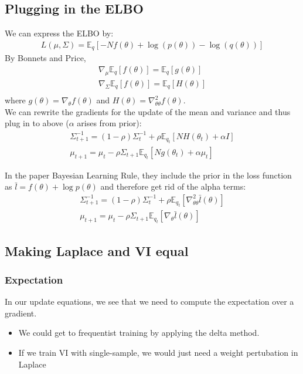 \documentclass[a4paper]{scrartcl}
\begin{document}
  \subsection{Plugging in the ELBO}\label{sec:ELBO}
    We can express the ELBO by: 
    \begin{align*}
      L(\mu, \Sigma) = \mathbb{E}_q[-N f(\theta) + \log(p(\theta)) - \log(q(\theta))]
    \end{align*}
    By Bonnets and Price,
    \begin{align*}
      \nabla_\mu \mathbb{E}_q[f(\theta)] = \mathbb{E}_q[g(\theta)]\\
      \nabla_\Sigma \mathbb{E}_q[f(\theta)] = \mathbb{E}_q[H(\theta)]\\
    \end{align*}
    where $g(\theta) = \nabla_\theta f(\theta)$ and $H(\theta) = \nabla^2_{\theta\theta} f(\theta)$.\\
    We can rewrite the gradients for the update of the mean and variance and
    thus plug in to above ($\alpha$ arises from prior):
    \begin{align*}
      \Sigma_{t+1}^{-1} = (1-\rho)\Sigma^{-1}_t + \rho \mathbb{E}_{q_t}[N H(\theta_t) + \alpha I]\\
      \mu_{t+1} = \mu_t - \rho \Sigma_{t+1}\mathbb{E}_{q_t}[N g(\theta_t) + \alpha \mu_t]
    \end{align*}

  In the paper Bayesian Learning Rule, they include the prior in the loss
  function as $\bar{l} = f(\theta) + \log{p(\theta)}$ and therefore get rid of the
  alpha terms:
  \begin{align*}
    \Sigma_{t+1}^{-1} = (1-\rho)\Sigma^{-1}_t + \rho \mathbb{E}_{q_t}[\nabla^2_{\theta\theta} \bar{l}(\theta)]\\
    \mu_{t+1} = \mu_t - \rho \Sigma_{t+1}\mathbb{E}_{q_t}[\nabla_{\theta} \bar{l}(\theta)]
  \end{align*}

  \subsection{Making Laplace and VI equal}

    \subsubsection{Expectation}
      In our update equations, we see that we need to compute the expectation
      over a gradient. 
      \begin{itemize}
        \item We could get to frequentist training by applying the
        delta method.
        \item If we train VI with single-sample, we would just need a weight pertubation in Laplace
      \end{itemize}
\end{document}
